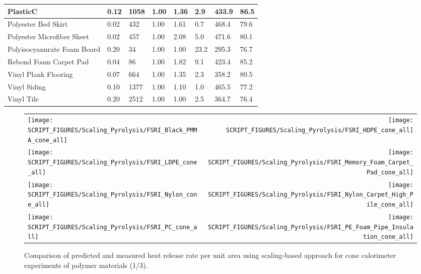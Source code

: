 \begin{table}[!h]
\begin{tabular}{|p{5.5cm}|p{1.0cm}|p{1.0cm}|p{0.8cm}|p{1.4cm}|p{1.0cm}|p{1.0cm}|p{1.2cm}|}
PlasticC & 0.12 & 1058 & 1.00 & 1.36 & 2.9 & 433.9 & 86.5 \\ \hline
Polyester Bed Skirt & 0.02 & 432 & 1.00 & 1.61 & 0.7 & 468.4 & 79.6 \\ \hline
Polyester Microfiber Sheet & 0.02 & 457 & 1.00 & 2.08 & 5.0 & 471.6 & 80.1 \\ \hline
Polyisocyanurate Foam Board & 0.20 & 34 & 1.00 & 1.00 & 23.2 & 295.3 & 76.7 \\ \hline
Rebond Foam Carpet Pad & 0.04 & 86 & 1.00 & 1.82 & 9.1 & 423.4 & 85.2 \\ \hline
Vinyl Plank Flooring & 0.07 & 664 & 1.00 & 1.35 & 2.3 & 358.2 & 80.5 \\ \hline
Vinyl Siding & 0.10 & 1377 & 1.00 & 1.10 & 1.0 & 465.5 & 77.2 \\ \hline
Vinyl Tile & 0.20 & 2512 & 1.00 & 1.00 & 2.5 & 364.7 & 76.4 \\ \hline
\end{tabular}
\label{Properties_FSRI_NIJ_Materials_polymers}
\end{table}

\begin{figure}[p]
\begin{tabular*}{\textwidth}{l@{\extracolsep{\fill}}r}
\texttt{[image: SCRIPT\_FIGURES/Scaling\_Pyrolysis/FSRI\_Black\_PMMA\_cone\_all]} &
\texttt{[image: SCRIPT\_FIGURES/Scaling\_Pyrolysis/FSRI\_HDPE\_cone\_all]} \\
\texttt{[image: SCRIPT\_FIGURES/Scaling\_Pyrolysis/FSRI\_LDPE\_cone\_all]} &
\texttt{[image: SCRIPT\_FIGURES/Scaling\_Pyrolysis/FSRI\_Memory\_Foam\_Carpet\_Pad\_cone\_all]} \\
\texttt{[image: SCRIPT\_FIGURES/Scaling\_Pyrolysis/FSRI\_Nylon\_cone\_all]} &
\texttt{[image: SCRIPT\_FIGURES/Scaling\_Pyrolysis/FSRI\_Nylon\_Carpet\_High\_Pile\_cone\_all]} \\
\texttt{[image: SCRIPT\_FIGURES/Scaling\_Pyrolysis/FSRI\_PC\_cone\_all]} &
\texttt{[image: SCRIPT\_FIGURES/Scaling\_Pyrolysis/FSRI\_PE\_Foam\_Pipe\_Insulation\_cone\_all]} \\
\end{tabular*}
\caption[HRRPUA of FSRI materials using scaling model, polymer materials]
{Comparison of predicted and measured heat release rate per unit area using scaling-based approach for cone calorimeter experiments of polymer materials (1/3).}
\label{FSRI_Materials_polymers1}
\end{figure}

